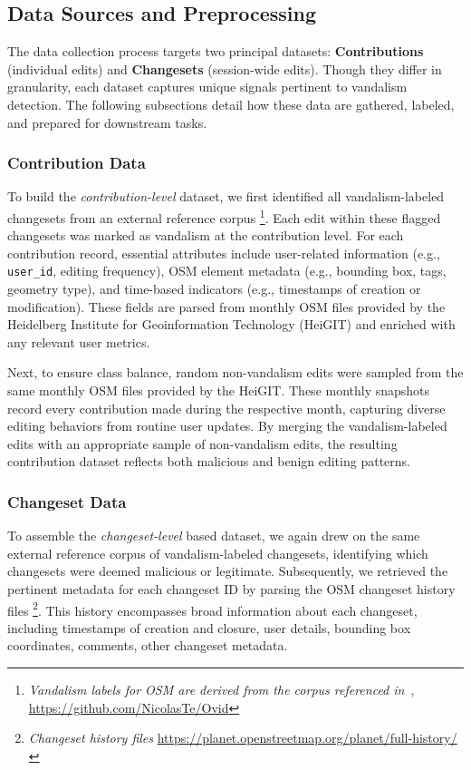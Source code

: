\documentclass[
    13pt, %
    a4paper, %
    listof=totoc, %
    bibliography=totoc, %
    index=totoc, %
    headsepline
]{scrreprt}
\begin{document}
\subsection{Data Sources and Preprocessing}
\label{sec:data_sources_preprocessing}

The data collection process targets two principal datasets: \textbf{Contributions} (individual edits) and \textbf{Changesets} (session-wide edits). Though they differ in granularity, each dataset captures unique signals pertinent to vandalism detection. The following subsections detail how these data are gathered, labeled, and prepared for downstream tasks.

\subsubsection{Contribution Data}
\label{sec:contributions_data}

To build the \emph{contribution-level} dataset, we first identified all vandalism-labeled changesets from an external reference corpus \footnote{\emph{Vandalism labels for OSM are derived from the corpus referenced in~\cite{Tempelmeier2022}}, \url{https://github.com/NicolasTe/Ovid}}. Each edit within these flagged changesets was marked as vandalism at the contribution level. For each contribution record, essential attributes include user-related information (e.g., \texttt{user\_id}, editing frequency), OSM element metadata (e.g., bounding box, tags, geometry type), and time-based indicators (e.g., timestamps of creation or modification). These fields are parsed from monthly OSM files provided by the Heidelberg Institute for Geoinformation Technology (HeiGIT) and enriched with any relevant user metrics.

Next, to ensure class balance, random non-vandalism edits were sampled from the same monthly OSM files provided by the HeiGIT. These monthly snapshots record every contribution made during the respective month, capturing diverse editing behaviors from routine user updates. By merging the vandalism-labeled edits with an appropriate sample of non-vandalism edits, the resulting contribution dataset reflects both malicious and benign editing patterns.

\subsubsection{Changeset Data}
\label{sec:changesets_data}

To assemble the \emph{changeset-level} based dataset, we again drew on the same external reference corpus of vandalism-labeled changesets, identifying which changesets were deemed malicious or legitimate. Subsequently, we retrieved the pertinent metadata for each changeset ID by parsing the OSM changeset history files \footnote{\emph{Changeset history files} \url{https://planet.openstreetmap.org/planet/full-history/}}. This history encompasses broad information about each changeset, including timestamps of creation and closure, user details, bounding box coordinates, comments, other changeset metadata.
\end{document}
